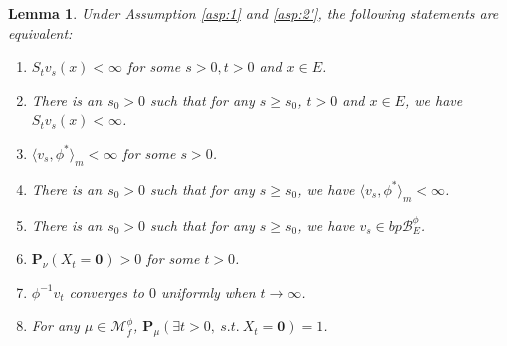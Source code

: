 \documentclass[UTF8]{pkuthss}
\theoremstyle{plain}
\newtheorem{lem}[thm]{Lemma}
\theoremstyle{definition}
\numberwithin{equation}{section}
\begin{document}
\begin{lem}\label{lem:discuss-of-assumption2'}
 Under Assumption \ref{asp:1} and \ref{asp:2'}, the following statements are equivalent:
\begin{enumerate}
\item[$(1)$]
	$S_tv_s(x)<\infty$ for some $s>0,t>0$ and $x\in E$.
\item[$(1')$]
	There is an $s_0>0$ such that for any $s\geq s_0$, $t>0$ and $x\in E$, we have $S_tv_s(x)<\infty$.
\item[$(2)$]
	$ \langle v_s, \phi^* \rangle_m < \infty$ for some $s>0$.
\item[$(2')$]
	There is an $s_0>0$ such that for any $s\geq s_0$, we have $\langle v_s, \phi^* \rangle_m < \infty$.
\item[$(3)$]
	There is an $s_0>0$ such that for any $s\geq s_0$, we have $v_s\in bp\mathscr B^\phi_E$.
\item[$(4)$]
	$\mathbf P_\nu (X_t = \mathbf 0) > 0$ for some $t>0$.
\item[$(5)$]
	$\phi^{-1}v_t$ converges to $0$ uniformly when $t\to\infty$.
\item[$(6)$]
	For any $\mu \in \mathcal M^\phi_f$, $\mathbf P_\mu(\exists t>0,~s.t.~X_t = \mathbf 0)
	= 1$.
\end{enumerate}
\end{lem}
\end{document}
